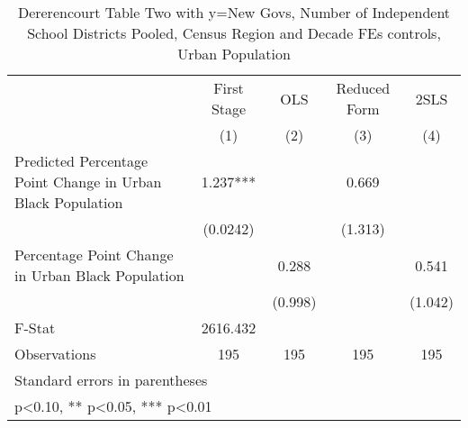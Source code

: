 \begin{table}[htbp]\centering
\def\sym#1{\ifmmode^{#1}\else\(^{#1}\)\fi}
\caption{Dererencourt Table Two with y=New Govs, Number of Independent School Districts  Pooled, Census Region and Decade FEs controls, Urban Population}
\begin{tabular}{l*{4}{c}}
\toprule
                    & First Stage   &         OLS   &Reduced Form   &        2SLS   \\
                    &\multicolumn{1}{c}{(1)}   &\multicolumn{1}{c}{(2)}   &\multicolumn{1}{c}{(3)}   &\multicolumn{1}{c}{(4)}   \\
\midrule
Predicted Percentage Point Change in Urban Black Population&       1.237***&               &       0.669   &               \\
                    &    (0.0242)   &               &     (1.313)   &               \\
\addlinespace
Percentage Point Change in Urban Black Population&               &       0.288   &               &       0.541   \\
                    &               &     (0.998)   &               &     (1.042)   \\
\midrule
F-Stat              &    2616.432   &               &               &               \\
Observations        &         195   &         195   &         195   &         195   \\
\bottomrule
\multicolumn{5}{l}{\footnotesize Standard errors in parentheses}\\
\multicolumn{5}{l}{\footnotesize * p<0.10, ** p<0.05, *** p<0.01}\\
\end{tabular}
\end{table}
